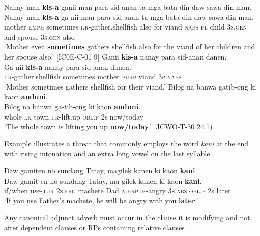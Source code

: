 \ea
Nanay  man  \textbf{kis-a}  ganii  man  para  sid-anan  ta mga  bata  din  daw  sawa  din  man. \\\smallskip
 \gll Nanay  man  \textbf{kis-a}  ga-nii  man  para  sid-anan  ta mga  bata  din  daw  sawa  din  man. \\
mother  \textsc{emph}  sometimes  \textsc{i.r}-gather.shellfish  also  for  viand  \textsc{nabs}
\textsc{pl}  child  3\textsc{s.gen}  and  spouse  3\textsc{s.gen}  also \\
\glt `Mother even \textbf{sometimes} gathers shellfish also for the viand of her children and her spouse also.’ [IC0E-C-01 9]
\z
\ea
Ganii  \textbf{kis-a}  nanay  para  sid-anan  danen. \\\smallskip
 \gll Ga-nii  \textbf{kis-a}  nanay  para  sid-anan  danen. \\
\textsc{i.r}-gather.shellfish  sometimes  mother  \textsc{purp}  viand  3\textsc{p.nabs} \\
\glt ‘Mother sometimes gathers shellfish for their viand.’
\z
\ea
Bilog  na  banwa  gatib-ong  ki  kaon  \textbf{anduni}. \\\smallskip
 \gll Bilog  na  banwa  ga-tib-ong\footnotemark{}  ki  kaon  \textbf{anduni}. \\
whole  \textsc{lk}  town  \textsc{i.r}-lift.up  \textsc{obl.p}  2s  now/today \\
\glt ‘The whole town is lifting you up \textbf{now/today}.’ [JCWO-T-30 24.1)
\z

Example  illustrates a threat that commonly employs the word \textit{kani} at the end with rising intonation and an extra long vowel on the last syllable.

\ea
\label{bkm:Ref425515410}
Daw  gamiten  no  sundang  Tatay,  magilek  kanen  ki  kaon  \textbf{kani}. \\\smallskip
 \gll Daw  gamit-en  no  sundang  Tatay,  ma-gilek  kanen  ki  kaon  \textbf{kani}. \\
if/when  use-\textsc{t.ir}  2\textsc{s.erg}  machete  Dad  \textsc{a.hap.ir}-angry  3\textsc{s.abs}  \textsc{obl.p}  2s  later \\
\glt ‘If you use Father’s machete, he will be angry with you \textbf{later}.’
\z

Any canonical adjunct adverb must occur in the clause it is modifying and not after dependent clauses or RPs containing relative clauses .

